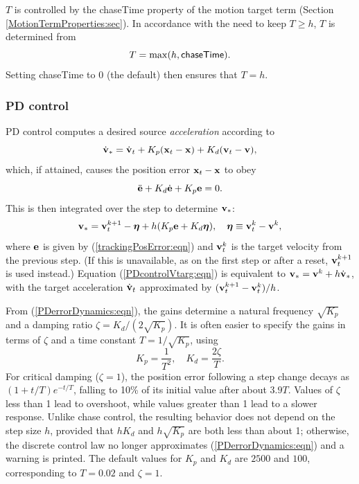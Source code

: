 $T$ is controlled by the {\sf chaseTime} property of the motion target term
(Section \ref{MotionTermProperties:sec}). In accordance with the need
to keep $T \ge h$, $T$ is determined from
%
\begin{equation*}
T = \max (h, \text{\sf chaseTime}).
\end{equation*}
%
Setting {\sf chaseTime} to 0 (the default) then ensures that $T = h$.

\subsubsection{PD control}
\label{PDControl:sec}

PD control computes a desired source {\it acceleration} according to
%
\begin{equation}
\dot{{\bf v}}_* = \dot{{\bf v}}_t + K_p ({\bf x}_t - {\bf x}) + K_d ({\bf v}_t - {\bf v}),
\label{PDcontrol:eqn}
\end{equation}
%
which, if attained, causes the position error ${\bf x}_t - {\bf x}$ to obey
%
\begin{equation}
\ddot{{\bf e}} + K_d \dot{{\bf e}} + K_p {\bf e} = 0.
\label{PDerrorDynamics:eqn}
\end{equation}
%
This is then integrated over the step to determine ${\bf v}_*$:
%
\begin{equation}
{\bf v}_* = {\bf v}_t^{k+1} - \boldsymbol{\eta} + h (K_p {\bf e} + K_d \boldsymbol{\eta}),
\quad \boldsymbol{\eta} \equiv {\bf v}_t^k - {\bf v}^k,
\label{PDcontrolVtarg:eqn}
\end{equation}
%
where ${\bf e}$ is given by (\ref{trackingPosError:eqn}) and ${\bf v}_t^k$ is the target
velocity from the previous step. (If this is unavailable, as on the first
step or after a reset, ${\bf v}_t^{k+1}$ is used instead.)  Equation
(\ref{PDcontrolVtarg:eqn}) is equivalent to ${\bf v}_* = {\bf v}^k + h \dot{{\bf v}}_*$, with
the target acceleration $\dot{{\bf v}}_t$ approximated by $({\bf v}_t^{k+1} -
{\bf v}_t^k)/h$.

From (\ref{PDerrorDynamics:eqn}), the gains determine a natural frequency
$\sqrt{K_p}$ and a damping ratio $\zeta = K_d / (2 \sqrt{K_p})$. It is often
easier to specify the gains in terms of $\zeta$ and a time constant $T =
1/\sqrt{K_p}$, using
%
\begin{equation*}
K_p = \frac{1}{T^2}, \quad K_d = \frac{2 \zeta}{T}.
\end{equation*}
%
For critical damping ($\zeta = 1$), the position error following a step
change decays as $(1 + t/T) e^{-t/T}$, falling to 10\% of its initial value
after about $3.9 T$. Values of $\zeta$ less than 1 lead to overshoot, while
values greater than 1 lead to a slower response. Unlike chase control, the
resulting behavior does not depend on the step size $h$, provided that $h
K_d$ and $h \sqrt{K_p}$ are both less than about 1; otherwise, the discrete
control law no longer approximates (\ref{PDerrorDynamics:eqn}) and a warning
is printed. The default values for $K_p$ and $K_d$ are $2500$ and $100$,
corresponding to $T = 0.02$ and $\zeta = 1$.

